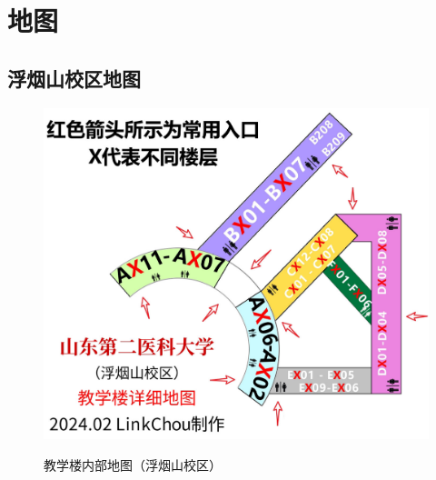 \chapter[地图]{地图}

\section[浮烟山校区地图]{浮烟山校区地图\footnotemark}
\noindent\begin{figure}[H]
    \centering
    \caption[map_teach]{教学楼内部地图（浮烟山校区）}
    \vspace{1em}
    \includegraphics*[width = \linewidth]{浮烟山校区教学楼.pdf}
    \label{map_t}
\end{figure}

